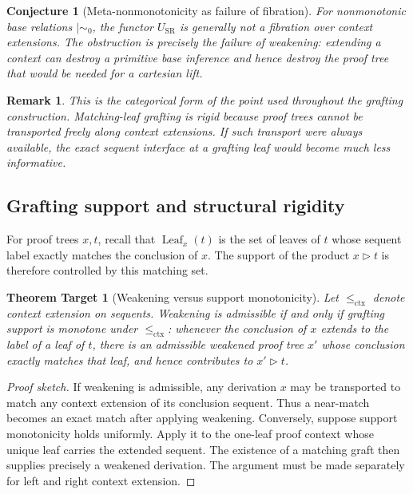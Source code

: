 \documentclass[11pt]{article}
\newtheorem{remark}[theorem]{Remark}
\newtheorem{conjecture}[theorem]{Conjecture}
\newtheorem{target}[theorem]{Theorem Target}
\newcommand{\mszero}{\mathrel{\mid\!\sim_{0}}}
\begin{document}
\begin{conjecture}[Meta-nonmonotonicity as failure of fibration]
For nonmonotonic base relations \(\mszero\), the functor
\(U_{\mathrm{SR}}\) is generally not a fibration over context extensions.
The obstruction is precisely the failure of weakening: extending a context
can destroy a primitive base inference and hence destroy the proof tree that
would be needed for a cartesian lift.
\end{conjecture}

\begin{remark}
This is the categorical form of the point used throughout the grafting
construction.  Matching-leaf grafting is rigid because proof trees cannot be
transported freely along context extensions.  If such transport were always
available, the exact sequent interface at a grafting leaf would become much
less informative.
\end{remark}

\subsection{Grafting support and structural rigidity}

For proof trees \(x,t\), recall that \(\operatorname{Leaf}_x(t)\) is the set
of leaves of \(t\) whose sequent label exactly matches the conclusion of
\(x\).  The support of the product \(x\triangleright t\) is therefore
controlled by this matching set.

\begin{target}[Weakening versus support monotonicity]
Let \(\leq_{\mathrm{ctx}}\) denote context extension on sequents.  Weakening is
admissible if and only if grafting support is monotone under
\(\leq_{\mathrm{ctx}}\): whenever the conclusion of \(x\) extends to the
label of a leaf of \(t\), there is an admissible weakened proof tree \(x'\)
whose conclusion exactly matches that leaf, and hence contributes to
\(x'\triangleright t\).
\end{target}

\begin{proof}[Proof sketch]
If weakening is admissible, any derivation \(x\) may be transported to match
any context extension of its conclusion sequent.  Thus a near-match becomes
an exact match after applying weakening.  Conversely, suppose support
monotonicity holds uniformly.  Apply it to the one-leaf proof context whose
unique leaf carries the extended sequent.  The existence of a matching graft
then supplies precisely a weakened derivation.  The argument must be made
separately for left and right context extension.
\end{proof}
\end{document}
